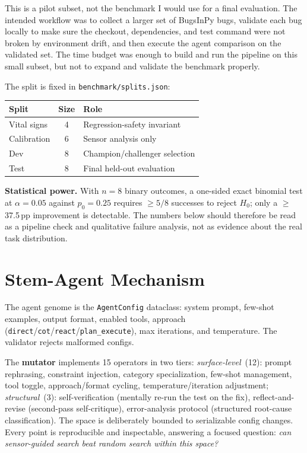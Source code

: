 \documentclass[11pt,a4paper]{article}
\begin{document}
This is a pilot subset, not the benchmark I would use for a final evaluation. The
intended workflow was to collect a larger set of BugsInPy bugs, validate each
bug locally to make sure the checkout, dependencies, and test command were not
broken by environment drift, and then execute the agent comparison on the
validated set. The time budget was enough to build and run the pipeline on this
small subset, but not to expand and validate the benchmark properly.

The split is fixed in \texttt{benchmark/splits.json}:

\begin{center}\small
\begin{tabular}{lcl}
\toprule
Split & Size & Role \\
\midrule
Vital signs & 4 & Regression-safety invariant \\
Calibration & 6 & Sensor analysis only \\
Dev & 8 & Champion/challenger selection \\
Test & 8 & Final held-out evaluation \\
\bottomrule
\end{tabular}
\end{center}

\textbf{Statistical power.} With $n{=}8$ binary outcomes, a one-sided exact
binomial test at $\alpha{=}0.05$ against $p_0{=}0.25$ requires $\geq 5/8$
successes to reject $H_0$; only a $\geq$37.5\,pp improvement is detectable.
The numbers below should therefore be read as a pipeline check and qualitative
failure analysis, not as evidence about the real task distribution.

\section{Stem-Agent Mechanism}

The agent genome is the \texttt{AgentConfig} dataclass: system prompt, few-shot
examples, output format, enabled tools, approach (\texttt{direct}/\texttt{cot}/\texttt{react}/\texttt{plan\_execute}),
max iterations, and temperature. The validator rejects malformed configs.

The \textbf{mutator} implements 15 operators in two tiers:
\emph{surface-level}~(12): prompt rephrasing, constraint injection, category
specialization, few-shot management, tool toggle, approach/format cycling,
temperature/iteration adjustment;
\emph{structural}~(3): self-verification (mentally re-run the test on the fix),
reflect-and-revise (second-pass self-critique), error-analysis protocol
(structured root-cause classification).
The space is deliberately bounded to serializable config changes. Every point
is reproducible and inspectable, answering a focused question: \emph{can
sensor-guided search beat random search within this space?}
\end{document}
